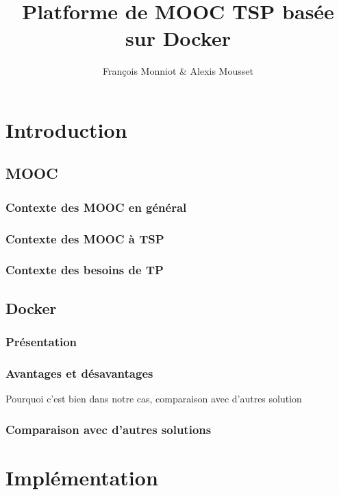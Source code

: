 \documentclass[a4paper,11pt]{report}
\title{Platforme de MOOC TSP basée sur Docker}
\author{François Monniot \& Alexis Mousset}
\begin{document}
\maketitle
\tableofcontents

\begin{abstract}

\end{abstract}

\chapter{Introduction}

\section{MOOC}

\subsection{Contexte des MOOC en général}

\subsection{Contexte des MOOC à TSP}

\subsection{Contexte des besoins de TP}

\section{Docker}

\subsection{Présentation}

\subsection{Avantages et désavantages}
Pourquoi c'est bien dans notre cas, comparaison avec d'autres solution

\subsection{Comparaison avec d'autres solutions}

\chapter{Implémentation}
\end{document}
